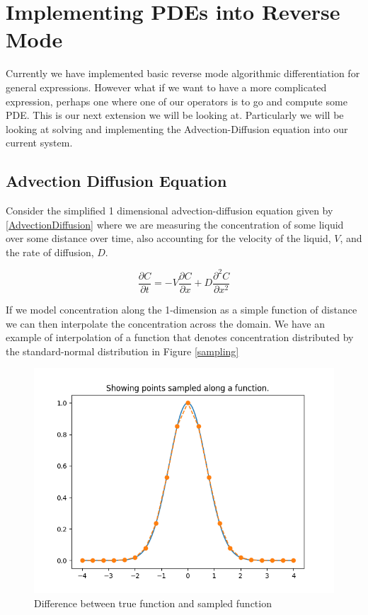 \documentclass{article}
\begin{document}
\section{Implementing PDEs into Reverse Mode}

Currently we have implemented basic reverse mode algorithmic differentiation for general expressions. However what if we want to have a more complicated expression, perhaps one where one of our operators is to go and compute some PDE. This is our next extension we will be looking at. Particularly we will be looking at solving and implementing the Advection-Diffusion equation into our current system.

\subsection{Advection Diffusion Equation}

Consider the simplified 1 dimensional advection-diffusion equation given by \eqref{AdvectionDiffusion} where we are measuring the concentration of some liquid over some distance over time, also accounting for the velocity of the liquid, $V$, and the rate of diffusion, $D$.

\begin{equation}
    \label{AdvectionDiffusion}
    \frac{\partial C}{\partial t} = - V\frac{\partial C}{\partial x} + D\frac{\partial^2 C}{\partial x^2}
\end{equation}

If we model concentration along the 1-dimension as a simple function of distance we can then interpolate the concentration across the domain. We have an example of interpolation of a function that denotes concentration distributed by the standard-normal distribution in Figure \ref{sampling}

\begin{figure}
\centering
    \includegraphics[width=12cm]{images/show_sampling.png}
    \caption{Difference between true function and sampled function}
    \label{fig:sampling}
\end{figure}
\end{document}
